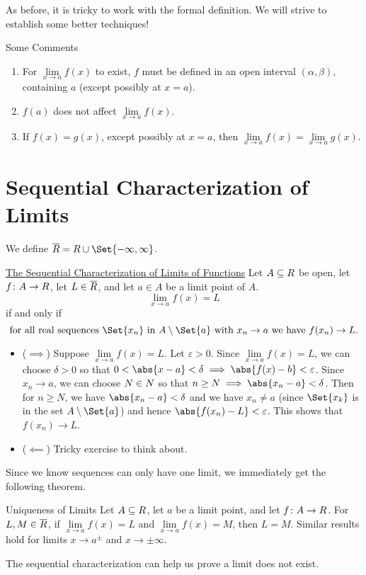 As before, it is tricky to work with the formal definition. We will strive to establish some better techniques!

\begin{Remark}{Some Comments}{}
    \begin{enumerate}[(1)]
        \item For $ \lim\limits_{{x} \to {a}}f(x) $ to exist, $ f $ must be defined in an open interval $ (\alpha,\beta) $, containing
              $ a $ (except possibly at $ x=a $).
        \item $ f(a) $ does not affect $ \lim\limits_{{x} \to {a}}f(x) $.
        \item If $ f(x)=g(x) $, except possibly at $ x=a $, then $ \lim\limits_{{x} \to {a}}f(x)=\lim\limits_{{x} \to {a}}g(x) $.
    \end{enumerate}
\end{Remark}
\section{Sequential Characterization of Limits}
We define $ \ER=R\cup\Set{-\infty,\infty} $.
\begin{Theorem}{\href{https://proofwiki.org/wiki/Sequential_Characterization_of_Limit_at_Positive_Infinity_of_Real_Function}{The Sequential Characterization of Limits of Functions}}{}
    Let $ A\subseteq \relax{R} $ be open, let $ f\colon A\to\relax{R} $, let $ L\in\overline{\relax{R}} $, and let $ a\in A $
    be a limit point of $ A $.
    \[ \lim\limits_{{x} \to {a}}f(x)=L  \]
    if and only if
    \[ \text{for all real sequences $ \Set{x_n} $ in $A\setminus \Set{a}$ with $ x_n\to a $ we have $ f(x_n)\to L $}. \]
    \tcblower{}
    \begin{itemize}
        \item ($ \implies $) Suppose $ \lim\limits_{{x} \to {a}}f(x)=L $. Let $ \varepsilon>0 $.
              Since $ \lim\limits_{{x} \to {a}}f(x)=L $, we can choose $ \delta>0 $ so that $ 0<\abs{x-a}<\delta\implies \abs{f(x)-b}<\varepsilon $.
              Since $ x_n\to a $, we can choose $ N\in\relax{N} $ so that $ n\ge N\implies \abs{x_n-a}<\delta $. Then for $ n\ge N $,
              we have $ \abs{x_n-a}<\delta $ and we have $ x_n\ne a $
              (since $ \Set{x_k} $ is in the set $ A\setminus \Set{a} $) and hence $ \abs{f(x_n)-L}<\varepsilon $. This shows that $ f(x_n)\to L $.
        \item ($ \impliedby $) Tricky exercise to think about.
    \end{itemize}
\end{Theorem}
Since we know sequences can only have one limit, we immediately get the following theorem.
\begin{Theorem}{Uniqueness of Limits}{}
    Let $ A\subseteq\relax{R} $, let $ a $ be a limit point, and let $ f\colon A\to \relax{R} $.
    For $ L,M\in\overline{\relax{R}} $, if $ \lim\limits_{{x} \to {a}}f(x)=L $ and $ \lim\limits_{{x} \to {a}}f(x)=M $, then
    $ L=M $. Similar results hold for limits $ x\to a^{\pm} $ and $ x\to \pm\infty $.
\end{Theorem}
The sequential characterization can help us prove a limit does not exist.
